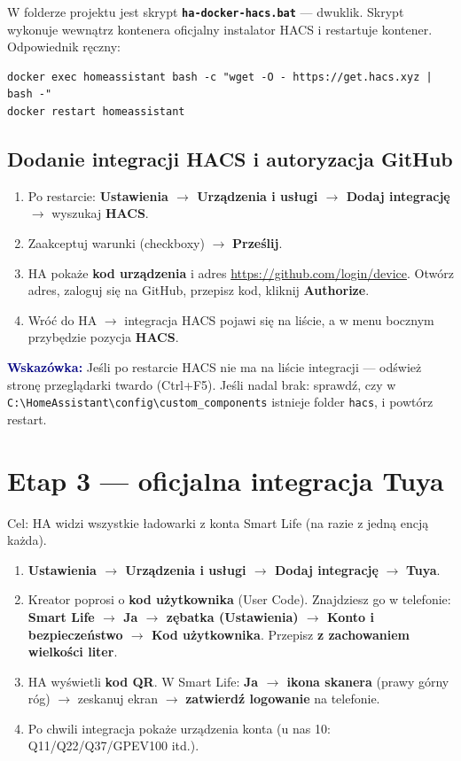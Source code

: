 \documentclass[11pt,a4paper]{article}
\newcommand{\wskazowka}[1]{\par\medskip\noindent\textcolor{navy}{\textbf{Wskazówka:}} #1\par\medskip}
\begin{document}
W folderze projektu jest skrypt \textbf{\texttt{ha-docker-hacs.bat}} --- dwuklik. Skrypt wykonuje wewnątrz kontenera oficjalny instalator HACS i restartuje kontener. Odpowiednik ręczny:

\begin{lstlisting}
docker exec homeassistant bash -c "wget -O - https://get.hacs.xyz | bash -"
docker restart homeassistant
\end{lstlisting}

\subsection{Dodanie integracji HACS i autoryzacja GitHub}

\begin{enumerate}
\item Po restarcie: \textbf{Ustawienia $\to$ Urządzenia i usługi $\to$ Dodaj integrację} $\to$ wyszukaj \textbf{HACS}.
\item Zaakceptuj warunki (checkboxy) $\to$ \textbf{Prześlij}.
\item HA pokaże \textbf{kod urządzenia} i adres \url{https://github.com/login/device}. Otwórz adres, zaloguj się na GitHub, przepisz kod, kliknij \textbf{Authorize}.
\item Wróć do HA $\to$ integracja HACS pojawi się na liście, a w menu bocznym przybędzie pozycja \textbf{HACS}.
\end{enumerate}

\wskazowka{Jeśli po restarcie HACS nie ma na liście integracji --- odśwież stronę przeglądarki twardo (Ctrl+F5). Jeśli nadal brak: sprawdź, czy w \texttt{C:\textbackslash HomeAssistant\textbackslash config\textbackslash custom\_components} istnieje folder \texttt{hacs}, i powtórz restart.}

\section{Etap 3 --- oficjalna integracja Tuya}
\label{sec:etap3}

Cel: HA widzi wszystkie ładowarki z konta Smart Life (na razie z jedną encją każda).

\begin{enumerate}
\item \textbf{Ustawienia $\to$ Urządzenia i usługi $\to$ Dodaj integrację} $\to$ \textbf{Tuya}.
\item Kreator poprosi o \textbf{kod użytkownika} (User Code). Znajdziesz go w telefonie: \textbf{Smart Life $\to$ Ja $\to$ zębatka (Ustawienia) $\to$ Konto i bezpieczeństwo $\to$ Kod użytkownika}. Przepisz \textbf{z zachowaniem wielkości liter}.
\item HA wyświetli \textbf{kod QR}. W Smart Life: \textbf{Ja $\to$ ikona skanera} (prawy górny róg) $\to$ zeskanuj ekran $\to$ \textbf{zatwierdź logowanie} na telefonie.
\item Po chwili integracja pokaże urządzenia konta (u nas 10: Q11/Q22/Q37/GPEV100 itd.).
\end{enumerate}
\end{document}
